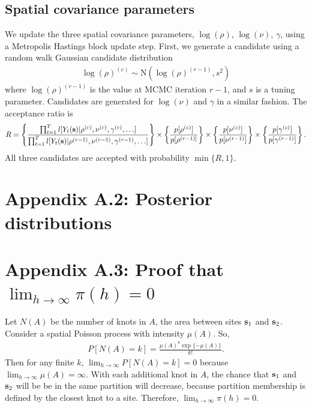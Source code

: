 \documentclass[11pt]{article}
\begin{document}
\subsection*{Spatial covariance parameters}
We update the three spatial covariance parameters, $\log(\rho)$, $\log(\nu)$, $\gamma$, using a Metropolis Hastings block update step.
First, we generate a candidate using a random walk Gaussian candidate distribution
\begin{align*}
	\log(\rho)^{(c)} \sim \text{N}(\log(\rho)^{(r - 1)}, s^2)
\end{align*}
where $\log(\rho)^{(r-1)}$ is the value at MCMC iteration $r - 1$, and $s$ is a tuning parameter.
Candidates are generated for $\log(\nu)$ and $\gamma$ in a similar fashion.
The acceptance ratio is
\begin{align*}
	R = \left\{ \frac{ \prod_{t = 1}^{T} l[Y_t(\mbox{\bf s}) | \rho^{(c)}, \nu^{(c)}, \gamma^{(c)}, \ldots] }{\prod_{t = 1}^{T} l[Y_t(\mbox{\bf s}) | \rho^{(r-1)}, \nu^{(r-1)}, \gamma^{(r-1)}, \ldots] } \right\} \times \left\{ \frac{ p[\rho^{(c)}] }{ p[\rho^{(r - 1)] } } \right\} \times \left\{ \frac{ p[\nu^{(c)}] }{ p[\nu^{(r - 1)}] } \right\} \times \left\{ \frac{ p[ \gamma^{(c)} ] }{ p[\gamma^{(r - 1)} ] } \right\}.
\end{align*}
All three candidates are accepted with probability $\min\{R, 1\}$.

\section*{Appendix A.2: Posterior distributions}





\section*{Appendix A.3: Proof that $\lim_{h \rightarrow \infty} \pi(h) = 0$}
Let $N(A)$ be the number of knots in $A$, the area between sites $\mbox{\bf s}_1$ and $\mbox{\bf s}_2$.
Consider a spatial Poisson process with intensity $\mu(A)$.
So,
\begin{align*}
  P[ N(A) = k] = \frac{ \mu(A)^k \exp\{ -\mu(A)\}}{k!}.
\end{align*}
Then for any finite $k$, $\lim_{h \rightarrow \infty} P[N(A) = k] = 0$ because $\lim_{h \rightarrow \infty} \mu(A) = \infty$.
With each additional knot in $A$, the chance that $\mbox{\bf s}_1$ and $\mbox{\bf s}_2$ will be be in the same partition will decrease, because partition membership is defined by the closest knot to a site.
Therefore, $\lim_{h \rightarrow \infty} \pi(h) = 0$.
\end{document}
